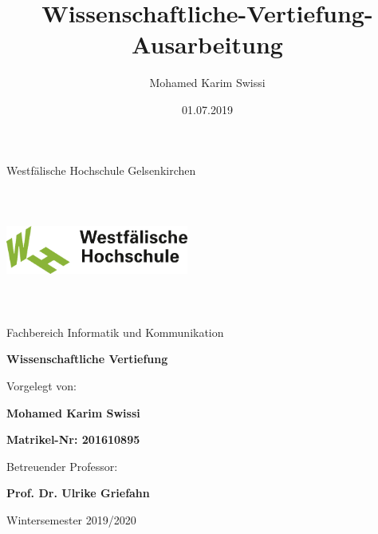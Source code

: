 \documentclass[a4paper,12pt,oneside]{book}
\title{Wissenschaftliche-Vertiefung-Ausarbeitung}
\date{01.07.2019}
\author{Mohamed Karim Swissi  }
\begin{document}
	
\begin{titlepage}
	\thispagestyle{empty}
	\begin{center}
		Westfälische Hochschule Gelsenkirchen
		
		
		\includegraphics[scale=0.8, width=6cm, height=4cm]{w-hs_pagelogo.png}
		
		Fachbereich Informatik und Kommunikation 
		
		
		\vskip 2cm
		\centerline{\Large{\textbf{Wissenschaftliche Vertiefung }}}
		
		\vskip 0.5cm
		\centerline{\Large{\textbf{  }}}
		
		
		
		\vskip 1cm
		
		\vskip 1cm
		\centerline{Vorgelegt von:}
		\vskip 0.4cm
		\centerline{\Large \textbf{Mohamed Karim Swissi}}
		\vskip 0.4cm
		\centerline{\Large \textbf{Matrikel-Nr: 201610895}}
		
		
		
		\vskip 1cm
		
		
		\centerline{Betreuender Professor:}
		\vskip 0.4cm
		\begin{center}
			\large \textbf{Prof. Dr. Ulrike Griefahn} \\
		\end{center}
		
		\vskip 0.4cm
		
		
		
		\vskip 1cm
		\centerline{Wintersemester 2019/2020}
		
	\end{center}
	
\end{titlepage}
\newpage
	
\end{document}
